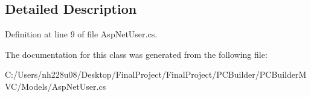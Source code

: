\subsection{Detailed Description}


Definition at line 9 of file Asp\+Net\+User.\+cs.



The documentation for this class was generated from the following file\+:\begin{DoxyCompactItemize}
\item 
C\+:/\+Users/nh228u08/\+Desktop/\+Final\+Project/\+Final\+Project/\+P\+C\+Builder/\+P\+C\+Builder\+M\+V\+C/\+Models/Asp\+Net\+User.\+cs\end{DoxyCompactItemize}
